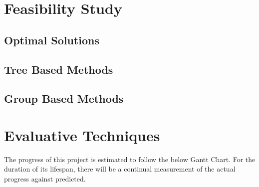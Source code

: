 \documentclass{report}
\begin{document}
    \section{Feasibility Study}
    \subsection{Optimal Solutions}
	\subsection{Tree Based Methods}
    \subsection{Group Based Methods}
    
    
    \section{Evaluative Techniques}
    The progress of this project is estimated to follow the below Gantt Chart. For the duration of its lifespan, there will be a continual measurement of the actual progress against predicted.
    
\end{document}

